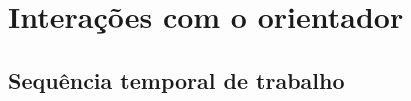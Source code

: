 \chapter{Interações com o orientador} \label{chap:interacoes}

\blindtext

\section{Sequência temporal de trabalho}\label{sec:trabalho}

\Blindtext
